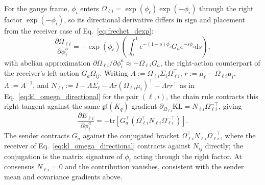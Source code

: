 \documentclass[11pt]{article}
\begin{document}
For the gauge frame, $\phi_i$ enters $\Omega_{\ell i} = \exp(\phi_\ell)\exp(-\phi_i)$ through the right factor $\exp(-\phi_i)$, so its directional derivative differs in sign and placement from the receiver case of Eq.~\eqref{eq:frechet_dexp}:
\begin{equation}
\frac{\partial \Omega_{\ell i}}{\partial \phi_i^a} = -\exp(\phi_\ell)\left(\int_0^1 e^{-(1-s)\phi_i} G_a e^{-s\phi_i} \mathrm{d}s\right),
\label{eq:frechet_dexp_sender}
\end{equation}
with abelian approximation $\partial \Omega_{\ell i}/\partial \phi_i^a \approx -\Omega_{\ell i} G_a$, the right-action counterpart of the receiver's left-action $G_a\Omega_{ij}$. Writing $A := \Omega_{\ell i}\Sigma_i\Omega_{\ell i}^\top$, $r := \mu_\ell - \Omega_{\ell i}\mu_i$, $\Lambda := A^{-1}$, and $N_{\ell i} := I - \Lambda\Sigma_\ell - \Lambda r(\Omega_{\ell i}\mu_i)^\top - \Lambda r r^\top$ as in Eq.~\eqref{eq:kl_omega_directional} for the pair $(\ell, i)$, the chain rule contracts this right tangent against the same $\mathfrak{gl}(K_q)$ gradient $\partial_{\Omega_{\ell i}}\mathrm{KL} = N_{\ell i}\Omega_{\ell i}^{-\top}$, giving
\begin{equation}
\frac{\partial E_{\ell i}}{\partial \phi_i^a} = -\mathrm{tr}\left[G_a^\top\left(\Omega_{\ell i}^\top N_{\ell i} \Omega_{\ell i}^{-\top}\right)\right].
\label{eq:sender_phi_gradient}
\end{equation}
The sender contracts $G_a$ against the conjugated bracket $\Omega_{\ell i}^\top N_{\ell i}\Omega_{\ell i}^{-\top}$, where the receiver of Eq.~\eqref{eq:kl_omega_directional} contracts against $N_{ij}$ directly; the conjugation is the matrix signature of $\phi_i$ acting through the right factor. At consensus $N_{\ell i} = 0$ and the contribution vanishes, consistent with the sender mean and covariance gradients above.
\end{document}
